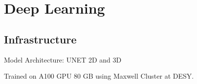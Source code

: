 \chapter{Deep Learning}
\section{Infrastructure}
Model Architecture: UNET 2D and 3D

Trained on A100 GPU 80 GB using Maxwell Cluster at DESY. 